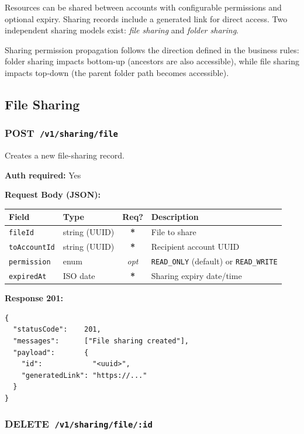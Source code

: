 \documentclass[12pt,a4paper]{article}
\newcommand{\httppost}[1]{%
  \colorbox{postcolor!20}{\textcolor{postcolor}{\textbf{\small POST}}}~\texttt{#1}%
}
\newcommand{\httpdelete}[1]{%
  \colorbox{deletecolor!20}{\textcolor{deletecolor}{\textbf{\small DELETE}}}~\texttt{#1}%
}
\newcommand{\required}{\textcolor{danger}{\textbf{*}}}
\newcommand{\optional}{\textcolor{muted}{\textit{opt}}}
\begin{document}
Resources can be shared between accounts with configurable permissions and optional expiry. Sharing records include a generated link for direct access. Two independent sharing models exist: \emph{file sharing} and \emph{folder sharing}.

\begin{warningbox}
  Sharing permission propagation follows the direction defined in the business rules:
  folder sharing impacts bottom-up (ancestors are also accessible), while file sharing impacts top-down (the parent folder path becomes accessible).
\end{warningbox}

\subsection{File Sharing}

\subsubsection{\httppost{/v1/sharing/file}}

Creates a new file-sharing record.

\textbf{Auth required:} Yes

\textbf{Request Body (JSON):}

\begin{tabularx}{\linewidth}{llcX}
\toprule
\textbf{Field} & \textbf{Type} & \textbf{Req?} & \textbf{Description} \\
\midrule
\texttt{fileId}      & string (UUID) & \required & File to share \\
\texttt{toAccountId} & string (UUID) & \required & Recipient account UUID \\
\texttt{permission}  & enum & \optional & \texttt{READ\_ONLY} (default) or \texttt{READ\_WRITE} \\
\texttt{expiredAt}   & ISO date & \required & Sharing expiry date/time \\
\bottomrule
\end{tabularx}

\textbf{Response 201:}
\begin{lstlisting}
{
  "statusCode":    201,
  "messages":      ["File sharing created"],
  "payload":       {
    "id":            "<uuid>",
    "generatedLink": "https://..."
  }
}
\end{lstlisting}

\vspace{0.5em}
\subsubsection{\httpdelete{/v1/sharing/file/:id}}
\end{document}
